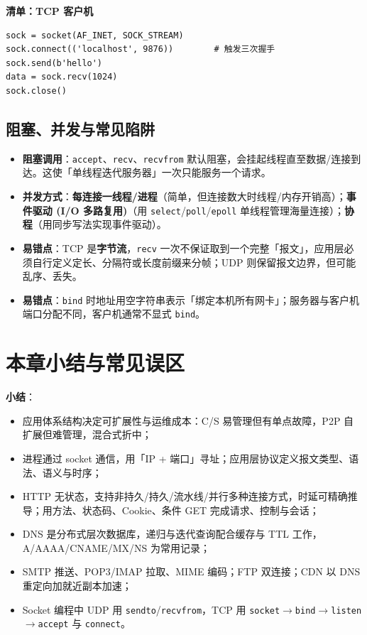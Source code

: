 \noindent\textbf{清单：TCP 客户机}
\begin{lstlisting}
sock = socket(AF_INET, SOCK_STREAM)
sock.connect(('localhost', 9876))        # 触发三次握手
sock.send(b'hello')
data = sock.recv(1024)
sock.close()
\end{lstlisting}

\subsection{阻塞、并发与常见陷阱}

\begin{itemize}
    \item \textbf{阻塞调用}：\texttt{accept}、\texttt{recv}、\texttt{recvfrom} 默认阻塞，会挂起线程直至数据/连接到达。这使「单线程迭代服务器」一次只能服务一个请求。
    \item \textbf{并发方式}：\textbf{每连接一线程/进程}（简单，但连接数大时线程/内存开销高）；\textbf{事件驱动 (I/O 多路复用)}（用 \texttt{select}/\texttt{poll}/\texttt{epoll} 单线程管理海量连接）；\textbf{协程}（用同步写法实现事件驱动）。
    \item \textbf{易错点}：TCP 是\textbf{字节流}，\texttt{recv} 一次不保证取到一个完整「报文」，应用层必须自行定义定长、分隔符或长度前缀来分帧；UDP 则保留报文边界，但可能乱序、丢失。
    \item \textbf{易错点}：\texttt{bind} 时地址用空字符串表示「绑定本机所有网卡」；服务器与客户机端口分配不同，客户机通常不显式 \texttt{bind}。
\end{itemize}

\section{本章小结与常见误区}

\textbf{小结}：

\begin{itemize}
    \item 应用体系结构决定可扩展性与运维成本：C/S 易管理但有单点故障，P2P 自扩展但难管理，混合式折中；
    \item 进程通过 socket 通信，用「IP + 端口」寻址；应用层协议定义报文类型、语法、语义与时序；
    \item HTTP 无状态，支持非持久/持久/流水线/并行多种连接方式，时延可精确推导；用方法、状态码、Cookie、条件 GET 完成请求、控制与会话；
    \item DNS 是分布式层次数据库，递归与迭代查询配合缓存与 TTL 工作，A/AAAA/CNAME/MX/NS 为常用记录；
    \item SMTP 推送、POP3/IMAP 拉取、MIME 编码；FTP 双连接；CDN 以 DNS 重定向加就近副本加速；
    \item Socket 编程中 UDP 用 \texttt{sendto}/\texttt{recvfrom}，TCP 用 \texttt{socket}$\to$\texttt{bind}$\to$\texttt{listen}$\to$\texttt{accept} 与 \texttt{connect}。
\end{itemize}

